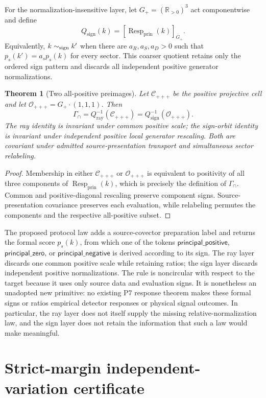 \documentclass[11pt]{article}
\newtheorem{theorem}{Theorem}
\newcommand{\RR}{\mathbb R}
\newcommand{\GammaInt}{\Gamma_{\cap}}
\newcommand{\Resp}{\operatorname{Resp}_{\mathrm{prin}}}
\newcommand{\Qray}{Q_{\mathrm{ray}}}
\newcommand{\Qsign}{Q_{\mathrm{sign}}}
\begin{document}
For the normalization-insensitive layer, let
\(G_+=(\RR_{>0})^3\) act componentwise and define
\[
 \Qsign(k)=[\Resp(k)]_{G_+}.
\]
Equivalently, \(k\sim_{\rm sign}k'\) when there are
\(a_R,a_S,a_D>0\) such that
\(p_s(k')=a_s p_s(k)\) for every sector.  This coarser quotient retains only
the ordered sign pattern and discards all independent positive generator
normalizations.

\begin{theorem}[Two all-positive preimages]
\label{thm:quotient}
Let \(\mathcal C_{+++}\) be the positive projective cell and let
\(\mathcal O_{+++}=G_+\cdot(1,1,1)\).  Then
\[
 \GammaInt=\Qray^{-1}(\mathcal C_{+++})
           =\Qsign^{-1}(\mathcal O_{+++}).
\]
The ray identity is invariant under common positive scale; the sign-orbit
identity is invariant under independent positive local generator rescaling.
Both are covariant under admitted source-presentation transport and
simultaneous sector relabeling.
\end{theorem}

\begin{proof}
Membership in either \(\mathcal C_{+++}\) or \(\mathcal O_{+++}\) is
equivalent to positivity of all three components of \(\Resp(k)\), which is
precisely the definition of \(\GammaInt\).  Common and positive-diagonal
rescaling preserve component signs.  Source-presentation covariance preserves
each evaluation, while relabeling permutes the components and the respective
all-positive subset.
\end{proof}

The proposed protocol law adds a source-covector preparation label and returns
the formal score \(p_s(k)\), from which one of the tokens
\(\mathsf{principal\_positive}\),
\(\mathsf{principal\_zero}\), or
\(\mathsf{principal\_negative}\) is derived according to its sign.  The ray layer
discards one common positive scale while retaining ratios; the sign layer
discards independent positive normalizations.  The rule is noncircular with
respect to the target because it uses only source data and evaluation signs.
It is nonetheless an unadopted new primitive: no existing P7 response theorem
makes these formal signs or ratios empirical detector responses or physical
signal outcomes.  In particular, the ray layer does not itself supply the
missing relative-normalization law, and the sign layer does not retain the
information that such a law would make meaningful.

\section{Strict-margin independent-variation certificate}
\end{document}
